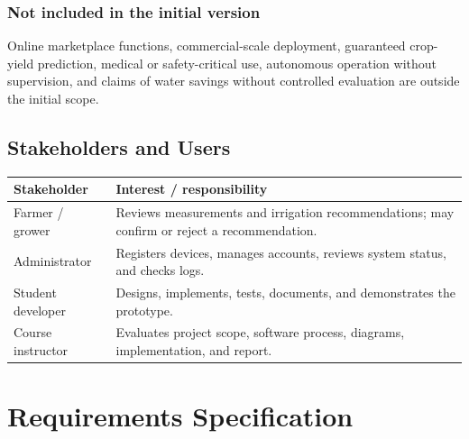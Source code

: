 \documentclass[12pt,a4paper]{report}
\begin{document}
\subsection{Not included in the initial version}
Online marketplace functions, commercial-scale deployment, guaranteed crop-yield prediction, medical or safety-critical use, autonomous operation without supervision, and claims of water savings without controlled evaluation are outside the initial scope.

\section{Stakeholders and Users}
\begin{longtable}{p{}p{}}
\toprule
\textbf{Stakeholder} & \textbf{Interest / responsibility}\\
\midrule
Farmer / grower & Reviews measurements and irrigation recommendations; may confirm or reject a recommendation.\\
Administrator & Registers devices, manages accounts, reviews system status, and checks logs.\\
Student developer & Designs, implements, tests, documents, and demonstrates the prototype.\\
Course instructor & Evaluates project scope, software process, diagrams, implementation, and report.\\
\bottomrule
\end{longtable}

\chapter{Requirements Specification}
\end{document}
